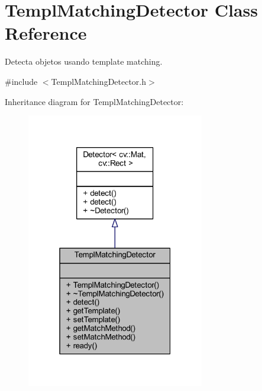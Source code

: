 \hypertarget{class_viscv_1_1_templ_matching_detector}{}\section{Templ\+Matching\+Detector Class Reference}
\label{class_viscv_1_1_templ_matching_detector}


Detecta objetos usando template matching.  




{\ttfamily \#include $<$Templ\+Matching\+Detector.\+h$>$}



Inheritance diagram for Templ\+Matching\+Detector\+:
\nopagebreak
\begin{figure}[H]
\begin{center}
\leavevmode
\includegraphics[width=220pt]{class_viscv_1_1_templ_matching_detector__inherit__graph}
\end{center}
\end{figure}


